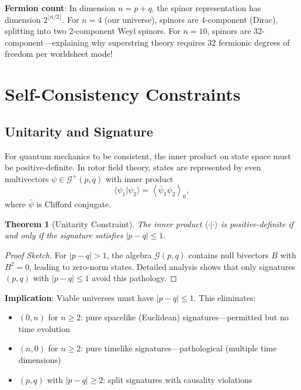 \documentclass[11pt,a4paper]{article}
\numberwithin{equation}{section}
\theoremstyle{plain}
\newtheorem{theorem}{Theorem}[section]
\theoremstyle{definition}
\theoremstyle{remark}
\newcommand{\Cl}{\mathcal{G}}               %
\newcommand{\grade}[2]{\left\langle #1 \right\rangle_{#2}}
\newcommand{\scal}[1]{\grade{#1}{0}}       %
\begin{document}
\textbf{Fermion count}: In dimension $n = p+q$, the spinor representation has dimension $2^{\lfloor n/2 \rfloor}$. For $n=4$ (our universe), spinors are 4-component (Dirac), splitting into two 2-component Weyl spinors. For $n=10$, spinors are 32-component—explaining why superstring theory requires 32 fermionic degrees of freedom per worldsheet mode!

\section{Self-Consistency Constraints}
\label{sec:constraints}

\subsection{Unitarity and Signature}

For quantum mechanics to be consistent, the inner product on state space must be positive-definite. In rotor field theory, states are represented by even multivectors $\psi \in \Cl^+(p,q)$ with inner product
\begin{equation}
\langle \psi_1 | \psi_2 \rangle = \scal{\bar{\psi}_1 \psi_2},
\end{equation}
where $\bar{\psi}$ is Clifford conjugate.

\begin{theorem}[Unitarity Constraint]
The inner product $\langle \cdot | \cdot \rangle$ is positive-definite if and only if the signature satisfies $|p - q| \leq 1$.
\label{thm:unitarity}
\end{theorem}

\begin{proof}[Proof Sketch]
For $|p-q| > 1$, the algebra $\Cl(p,q)$ contains null bivectors $B$ with $B^2 = 0$, leading to zero-norm states. Detailed analysis shows that only signatures $(p,q)$ with $|p-q| \leq 1$ avoid this pathology.
\end{proof}

\textbf{Implication}: Viable universes must have $|p-q| \leq 1$. This eliminates:
\begin{itemize}
\item $(0,n)$ for $n \geq 2$: pure spacelike (Euclidean) signatures—permitted but no time evolution
\item $(n,0)$ for $n \geq 2$: pure timelike signatures—pathological (multiple time dimensions)
\item $(p,q)$ with $|p-q| \geq 2$: split signatures with causality violations
\end{itemize}
\end{document}
